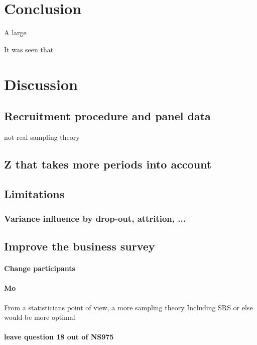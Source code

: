 \documentclass[12pt,a4paper,oneside]{book}
\begin{document}
\chapter{Conclusion}

A large 

It was seen that

\lipsum[1]


\chapter{Discussion}

\section{Recruitment procedure and panel data}
not real sampling theory



\section{Z that takes more periods into account}



\section{Limitations}

\subsection*{Variance influence by drop-out, attrition, ...}

\section{Improve the business survey}

\subsubsection*{Change participants}

\subsubsection*{Mo}
From a statisticians point of view, a more sampling theory Including SRS or else would be more optimal

\subsubsection{leave question 18 out of NS975}
\end{document}
